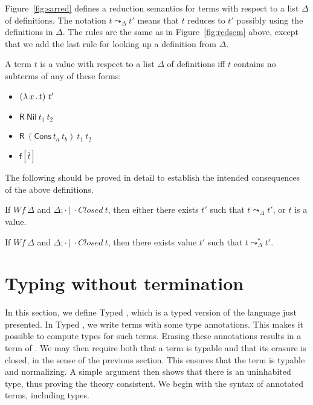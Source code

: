 \documentclass{article}
\begin{document}
Figure~\ref{fig:sarred} defines a reduction semantics for terms with
respect to a list $\Delta$ of definitions.  The notation $t \leadsto_\Delta t'$ means
that $t$ reduces to $t'$ possibly using the definitions in $\Delta$.  The rules are the same as in
Figure~\ref{fig:redsem} above, except that we add the last rule for
looking up a definition from $\Delta$.  


\begin{definition}
  A term $t$ is a value with respect to a list $\Delta$ of definitions iff $t$ contains no subterms of any of these forms:
  \begin{itemize}
  \item $(\lambda\, x\, .\, t)\ t'$
  \item $\mathsf{R}\ \mathsf{Nil}\ t_1\ t_2$
  \item $\mathsf{R}\ (\mathsf{Cons}\ t_a\ t_b)\ t_1\ t_2$
  \item $\mathsf{f}[\bar{t}]$
  \end{itemize}
\end{definition}

The following should be proved in detail to establish the intended consequences of the above definitions.

\begin{proposition}[Safety]
  If $\textit{Wf}\ \Delta$ and $\Delta;\cdot\ |\ \cdot \textit{Closed}\ t$,
  then either there exists $t'$ such that $t \leadsto_\Delta t'$, or
  $t$ is a value.
\end{proposition}

\begin{proposition}[Normalization]
  If $\textit{Wf}\ \Delta$ and $\Delta;\cdot\ |\ \cdot \textit{Closed}\ t$,
  then there exists value $t'$ such that $t \leadsto_\Delta^* t'$.
\end{proposition}

\section{Typing without termination}

In this section, we define Typed \sar, which is a typed version of the
\sar language just presented.  In Typed \sar, we write terms with some
type annotations.  This makes it possible to compute types for such
terms.  Erasing these annotations results in a term of \sar.  We may
then require both that a term is typable and that its erasure is
closed, in the sense of the previous section.  This ensures that the
term is typable and normalizing.  A simple argument then shows that
there is an uninhabited type, thus proving the theory consistent.  We
begin with the syntax of annotated terms, including types.
\end{document}

